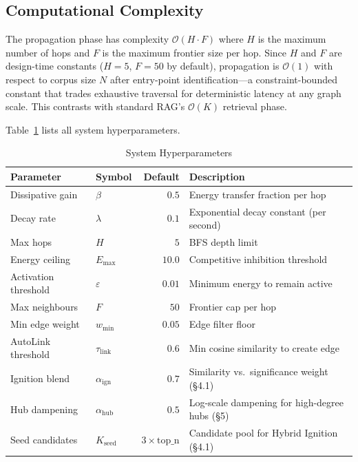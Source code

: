 \documentclass[11pt]{article}
\begin{document}
\subsection{Computational Complexity}

The propagation phase has complexity $\mathcal{O}(H \cdot F)$ where $H$
is the maximum number of hops and $F$ is the maximum frontier size per
hop. Since $H$ and $F$ are design-time constants ($H=5$, $F=50$ by
default), propagation is $\mathcal{O}(1)$ with respect to corpus size
$N$ after entry-point identification---a constraint-bounded constant
that trades exhaustive traversal for deterministic latency at any graph
scale. This contrasts with standard RAG's $\mathcal{O}(K)$ retrieval
phase.

Table~\ref{tab:hyperparams} lists all system hyperparameters.

\begin{table}[h]
\centering
\caption{System Hyperparameters}
\label{tab:hyperparams}
\begin{tabular}{llrl}
\toprule
\textbf{Parameter} & \textbf{Symbol} & \textbf{Default} & \textbf{Description} \\
\midrule
Dissipative gain       & $\beta$              & $0.5$   & Energy transfer fraction per hop \\
Decay rate             & $\lambda$            & $0.1$   & Exponential decay constant (per second) \\
Max hops               & $H$                  & $5$     & BFS depth limit \\
Energy ceiling         & $E_{\max}$           & $10.0$  & Competitive inhibition threshold \\
Activation threshold   & $\varepsilon$        & $0.01$  & Minimum energy to remain active \\
Max neighbours         & $F$                  & $50$    & Frontier cap per hop \\
Min edge weight        & $w_{\min}$           & $0.05$  & Edge filter floor \\
AutoLink threshold     & $\tau_{\text{link}}$ & $0.6$   & Min cosine similarity to create edge \\
Ignition blend         & $\alpha_{\text{ign}}$& $0.7$   & Similarity vs.\ significance weight (\S4.1) \\
Hub dampening          & $\alpha_{\text{hub}}$& $0.5$   & Log-scale dampening for high-degree hubs (\S5) \\
Seed candidates        & $K_{\text{seed}}$    & $3\times\text{top\_n}$ & Candidate pool for Hybrid Ignition (\S4.1) \\
\bottomrule
\end{tabular}
\end{table}
\end{document}
